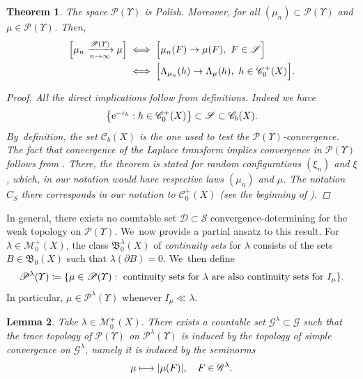 \documentclass[10pt]{amsart}
\newcommand\mto{\mathchoice{\longmapsto}{\mapsto}{\mapsto}{\mapsto}}
\newtheorem{theorem}{Theorem}[section]
\newtheorem{lemma}[theorem]{Lemma}
\theoremstyle{definition}
\theoremstyle{remark}
\DeclarePairedDelimiter{\bracket}{\lbrack}{\rbrack}
\DeclarePairedDelimiter{\set}{\lbrace}{\rbrace}
\DeclarePairedDelimiter{\abs}{\lvert}{\rvert}
\begin{document}
\begin{theorem}\label{t:weak-convergence-P-upsilon}
The space $\mathscr{P}(\varUpsilon)$ is Polish.
Moreover, for all $(\mu_{n}) \subset \mathscr{P}(\varUpsilon)$ and $\mu \in \mathscr{P}(\varUpsilon)$.
Then,
\begin{equation}\label{eq:t:weak-convergence-P-upsilon:0}
\begin{aligned}
\bracket[\Big]{ \mu_{n} \xrightarrow[n \to \infty]{\mathscr{P}(\varUpsilon)} \mu } &\iff \bracket[\Big]{ \mu_{n}(F) \to \mu(F),\ F \in \mathscr{S} }\\
&\iff \bracket[\Big]{ \Lambda_{\mu_{n}}(h) \to \Lambda_{\mu}(h),\ h \in \mathscr{C}_{0}^{+}(X) }.
\end{aligned}
\end{equation}

\begin{proof}
All the direct implications follow from definitions.
Indeed we have
\begin{equation*}
\set*{ \mathrm{e}^{-\iota_{h}} : h \in \mathscr{C}_{0}^{+}(X) } \subset \mathscr{S} \subset \mathscr{C}_{b}(X).
\end{equation*}
By~definition, the set $\mathscr{C}_{b}(X)$ is the one used to test the $\mathscr{P}(\varUpsilon)$-convergence.
The fact that convergence of the Laplace transform implies convergence in $\mathscr{P}(\varUpsilon)$ follows from \cite[Th.\,4.11]{Kallenberg}.
There, the theorem is stated for random configurations $(\xi_{n})$ and $\xi$, which, in our notation would have respective laws $(\mu_{n})$ and $\mu$.
The notation $\hat{C}_{S}$ there corresponds in our notation to $\mathscr{C}_{0}^{+}(X)$ (see the beginning of \cite[Ch.\,4]{Kallenberg}).
\end{proof}
\end{theorem}
In general, there exists no countable set $\mathscr{D} \subset \mathscr{S}$ convergence-determining for the weak topology on $\mathscr{P}(\varUpsilon)$. We~now provide a partial ansatz to this result.
For $\lambda \in \mathscr{M}_{0}^{+}(X)$, the class $\mathfrak{B}_{0}^{\lambda}(X)$ of \emph{continuity sets} for $\lambda$ consists of the sets $B \in \mathfrak{B}_{0}(X)$ such that $\lambda(\partial B) = 0$. We~then define
\begin{equation}\label{e:control-continuity-sets}
\mathscr{P}^{\lambda}(\varUpsilon) \coloneq \set*{ \mu \in \mathscr{P}(\varUpsilon) : \text{ continuity sets for $\lambda$ are also continuity sets for $I_{\mu}$} }.
\end{equation}
In particular, $\mu \in \mathscr{P}^{\lambda}(\varUpsilon)$ whenever $I_{\mu} \ll \lambda$.
\begin{lemma}\label{t:weak-convergence-countable}
Take $\lambda \in \mathscr{M}^{+}_{0}(X)$.
There exists a countable set $\mathscr{G}^{\lambda} \subset \mathscr{G}$ such that the trace topology of $\mathscr{P}(\varUpsilon)$ on $\mathscr{P}^{\lambda}(\varUpsilon)$ is induced by the topology of simple convergence on $\mathscr{G}^{\lambda}$, namely it is induced by the seminorms
\begin{equation}\label{e:weak-convergence-countable-seminorms}
\mu \mto \abs{\mu(F)}, \quad F \in \mathscr{G}^{\lambda}.
\end{equation}
\end{lemma}
\end{document}
